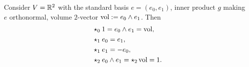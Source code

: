 \begin{example}
  Consider
    $V = \mathbb{R}^2$ with the standard basis $e = (e_0, e_1)$,
    inner product $g$ making $e$ orthonormal,
    volume $2$-vector $\mathop{\rm vol}\nolimits := e_0 \wedge e_1$.
  Then
  \begin{subequations}
    \begin{align}
      & \star_0 1 = e_0 \wedge e_1 = \mathop{\rm vol}\nolimits, \\
      & \star_1 e_0 = e_1, \\
      & \star_1 e_1 = - e_0, \\
      & \star_2 e_0 \wedge e_1 = \star_2 \mathop{\rm vol}\nolimits = 1.
    \end{align}
  \end{subequations}
\end{example}
